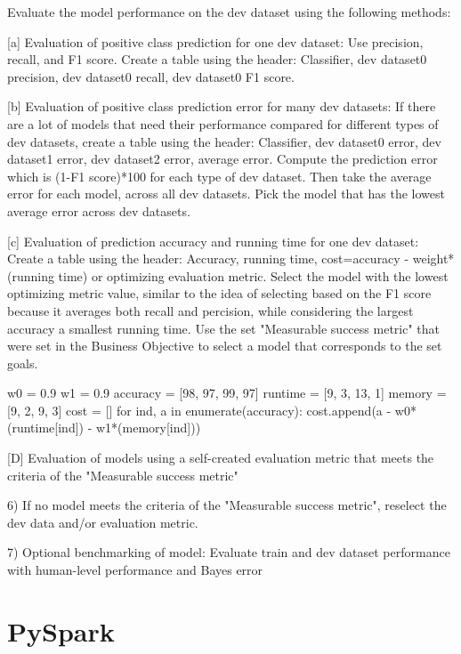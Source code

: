 \documentclass[11pt, onecolumn]{article}
\begin{document}
Evaluate the model performance on the dev dataset using the following methods:

[a] Evaluation of positive class prediction for one dev dataset: Use precision, recall, and F1 score. Create a table using the header: Classifier, dev dataset0 precision, dev dataset0 recall, dev dataset0 F1 score.

[b] Evaluation of positive class prediction error for many dev datasets: If there are a lot of models that need their performance compared for different types of dev datasets, create a table using the header: Classifier, dev dataset0 error, dev dataset1 error, dev dataset2 error, average error. Compute the prediction error which is (1-F1 score)*100 for each type of dev dataset. Then take the average error for each model, across all dev datasets. Pick the model that has the lowest average error across dev datasets.

[c] Evaluation of prediction accuracy and running time for one dev dataset: Create a table using the header: Accuracy, running time, cost=accuracy - weight*(running time) or optimizing evaluation metric. Select the model with the lowest optimizing metric value, similar to the idea of selecting based on the F1 score because it averages both recall and percision, while considering the largest accuracy a smallest running time. Use the set "Measurable success metric" that were set in the Business Objective to select a model that corresponds to the set goals.

w0 = 0.9
w1 = 0.9
accuracy = [98, 97, 99, 97]
runtime = [9, 3, 13, 1]
memory = [9, 2, 9, 3]
cost = []
for ind, a in enumerate(accuracy):
    cost.append(a - w0*(runtime[ind]) - w1*(memory[ind]))

[D] Evaluation of models using a self-created evaluation metric that meets the criteria of the "Measurable success metric"

6) If no model meets the criteria of the "Measurable success metric", reselect the dev data and/or evaluation metric.

7) Optional benchmarking of model: Evaluate train and dev dataset performance with human-level performance and Bayes error







\section{PySpark}
\end{document}
